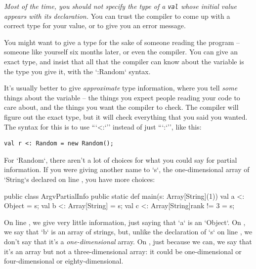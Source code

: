 \begin{description}
\begin{nonquote}
{\em Most of the time, you should not
specify the type of a {\tt val} whose initial value appears with its
declaration.}  
You can trust the compiler to come up with a correct type for your value, 
or to give you an error message.  

You might want to give a type for the sake of someone reading the program --
someone like yourself six months later, or even the compiler.  You can give an
exact type, and insist that all that the compiler can know about the variable
is the type you give it, with the \xcd`:Random` syntax.  

It's usually better to give {\em approximate} type information, where you tell
{\em some} things about the variable -- the things you expect people reading
your code to care about, and the things you want the compiler to check.  The
compiler will figure out the exact type, but it will check everything that you
said you wanted.  The syntax for this is to use ``\xcd`<:`'' instead of just
``\xcd`:`'', like this:
\begin{verbatim}
val r <: Random = new Random();
\end{verbatim}
For \xcd`Random`, there aren't a lot of choices for what you could say for
partial information.  If you were giving another name to \xcd`s`, the
one-dimensional array of \xcd`String`s declared on line , you
have more choices:
\begin{xtennum}[]
public class ArgvPartialInfo {
    public static def main(s: Array[String](1)) {
        val a <: Object = s; 
        val b <: Array[String] = s;
        val c <: Array[String]{rank != 3} = s;
    }
}
\end{xtennum}

On line , we give very little information, just saying
that \xcd`a` is an \xcd`Object`.  On , we say that
\xcd`b` is an array of strings, but, unlike the declaration of \xcd`s` on line
, we don't say that it's a {\em one-dimensional} array.  
On , just because we can, we say that it's 
an array but not a three-dimensional array: it could be one-dimensional or
four-dimensional or eighty-dimensional.  


\end{nonquote}
\end{description}
